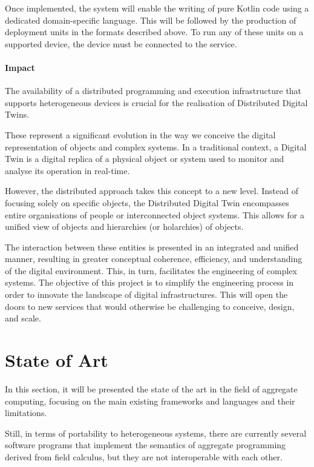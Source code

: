 
Once implemented, the system will enable the writing of pure Kotlin code using a dedicated domain-specific language.
This will be followed by the production of deployment units in the formats described above.
To run any of these units on a supported device, the device must be connected to the service.

\paragraph{Impact}
The availability of a distributed programming and execution infrastructure that supports heterogeneous devices is crucial
for the realisation of Distributed Digital Twins.

These represent a significant evolution in the way we conceive the digital representation of objects and complex systems.
In a traditional context, a Digital Twin is a digital replica of a physical object or system used to monitor and analyse
its operation in real-time.

However, the distributed approach takes this concept to a new level.
Instead of focusing solely on specific objects, the Distributed Digital Twin encompasses entire organisations of people
or interconnected object systems.
This allows for a unified view of objects and hierarchies (or holarchies) of objects.

The interaction between these entities is presented in an integrated and unified manner, resulting in greater conceptual
coherence, efficiency, and understanding of the digital environment.
This, in turn, facilitates the engineering of complex systems.
The objective of this project is to simplify the engineering process in order to innovate the landscape of digital infrastructures.
This will open the doors to new services that would otherwise be challenging to conceive, design, and scale.

\section{State of Art}
\label{sec:state-of-art}

In this section, it will be presented the state of the art in the field of aggregate computing, focusing on the main existing
frameworks and languages and their limitations.

Still, in terms of portability to heterogeneous systems, there are currently several software programs that implement the
semantics of aggregate programming derived from field calculus, but they are not interoperable with each other.

